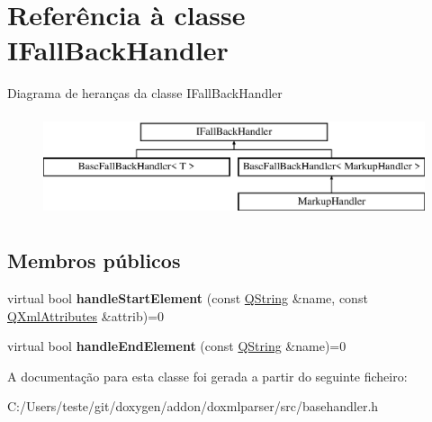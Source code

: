 \hypertarget{class_i_fall_back_handler}{\section{Referência à classe I\-Fall\-Back\-Handler}
\label{class_i_fall_back_handler}
}
Diagrama de heranças da classe I\-Fall\-Back\-Handler\begin{figure}[H]
\begin{center}
\leavevmode
\includegraphics[height=3.000000cm]{class_i_fall_back_handler}
\end{center}
\end{figure}
\subsection*{Membros públicos}
\begin{DoxyCompactItemize}
\item 
\hypertarget{class_i_fall_back_handler_ab5b407720be07a3e795ab91615ea5eba}{virtual bool {\bfseries handle\-Start\-Element} (const \hyperlink{class_q_string}{Q\-String} \&name, const \hyperlink{class_q_xml_attributes}{Q\-Xml\-Attributes} \&attrib)=0}\label{class_i_fall_back_handler_ab5b407720be07a3e795ab91615ea5eba}

\item 
\hypertarget{class_i_fall_back_handler_ac90ffe52bca4efd330da0b4f9cdcb4b1}{virtual bool {\bfseries handle\-End\-Element} (const \hyperlink{class_q_string}{Q\-String} \&name)=0}\label{class_i_fall_back_handler_ac90ffe52bca4efd330da0b4f9cdcb4b1}

\end{DoxyCompactItemize}


A documentação para esta classe foi gerada a partir do seguinte ficheiro\-:\begin{DoxyCompactItemize}
\item 
C\-:/\-Users/teste/git/doxygen/addon/doxmlparser/src/basehandler.\-h\end{DoxyCompactItemize}
